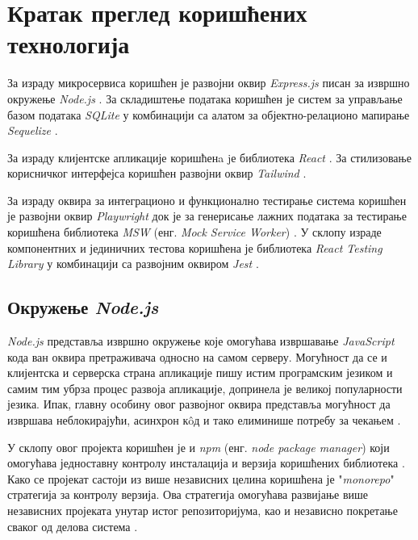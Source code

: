 \documentclass[12pt,oneside]{memoir}
\begin{document}
\section{Кратак преглед коришћених технологија}
\label{chp:tehnologije}

За израду микросервиса коришћен је развојни оквир \textit{Express.js} \cite{express} писан за извршно окружење \textit{Node.js} \cite{nodejs}. За складиштење података коришћен је систем за управљање базом података \textit{SQLite} \cite{sqlite} у комбинацији са алатом за објектно-релационо мапирање \textit{Sequelize} \cite{sequelize}. 

За израду клијентске апликације коришћенa jе библиотека \textit{React} \cite{react}. За стилизовање корисничког интерфејса коришћен развојни оквир \textit{Tailwind} \cite{tailwind}. 

За израду оквира за интеграционо и функционално тестирање система коришћен је развојни оквир \textit{Playwright} \cite{playwright} док је за генерисање лажних података за тестирање коришћена библиотека \textit{MSW} (енг. \textit{Mock Service Worker}) \cite{msw}. У склопу израде компонентних и јединичних тестова коришћена је библиотека \textit{React Testing Library} \cite{rtl} у комбинацији са развојним оквиром \textit{Jest} \cite{jest}.

\subsection{Окружење \textit{Node.js}}

\textit{Node.js} представља извршно окружење које омогућава извршавање \textit{JavaScript} кода ван оквира претраживача односно на самом серверу. Могућност да се и клијентска и серверска страна апликације пишу истим програмским језиком и самим тим убрза процес развоја апликације, допринела је великој популарности језика.
Ипак, главну особину овог развојног оквира представља могућност да извршава неблокирајући, асинхрон к\^{o}д и тако елиминише потребу за чекањем  \cite{w3nodejs}.

У склопу овог пројекта коришћен је и \textit{npm} (енг. \textit{node package manager}) који омогућава једноставну контролу инсталација и верзија коришћених библиотека \cite{npm}. Како се пројекат састоји из више независних целина коришћена је "\textit{monorepo}" стратегија за контролу верзија. Ова стратегија омогућава развијање више независних пројеката унутар истог репозиторијума, као и независно покретање сваког од делова система \cite{monorepo}.
\end{document}
